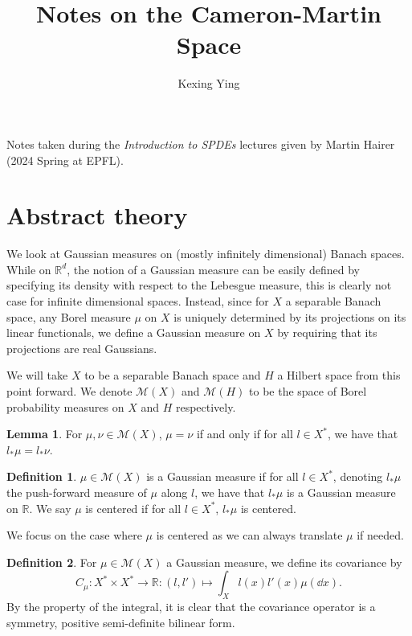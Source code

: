 \documentclass[]{article}
\title{Notes on the Cameron-Martin Space}
\author{Kexing Ying}
\theoremstyle{definition}
\theoremstyle{definition}
\newtheorem{definition}{Definition}[section]
\newtheorem{lemma}{Lemma}[section]
\begin{document}
\maketitle

Notes taken during the \textit{Introduction to SPDEs} lectures given by Martin Hairer 
(2024 Spring at EPFL).

\section*{Abstract theory}

We look at Gaussian measures on (mostly infinitely dimensional) Banach spaces. While on \(\mathbb{R}^d\), 
the notion of a Gaussian measure can be easily defined by specifying its density with respect to the 
Lebesgue measure, this is clearly not case for infinite dimensional spaces. Instead, since for \(X\) a 
separable Banach space, any Borel measure \(\mu\) on \(X\) is uniquely determined by its projections 
on its linear functionals, we define a Gaussian measure on \(X\) by requiring that its projections are 
real Gaussians. 

We will take \(X\) to be a separable Banach space and \(H\) a Hilbert space from this point forward.
We denote \(\mathcal{M}(X)\) and \(\mathcal{M}(H)\) to be the space of Borel probability measures 
on \(X\) and \(H\) respectively.

\begin{lemma}
  For \(\mu, \nu \in \mathcal{M}(X)\), \(\mu = \nu\) if and only if for all \(l \in X^*\), we have that 
  \(l_* \mu = l_* \nu\).
\end{lemma}

\begin{definition}
  \(\mu \in \mathcal{M}(X)\) is a Gaussian measure if for all \(l \in X^*\), denoting \(l_* \mu\) the 
  push-forward measure of \(\mu\) along \(l\), we have that \(l_* \mu\) is a Gaussian measure on \(\mathbb{R}\).
  We say \(\mu\) is centered if for all \(l \in X^*\), \(l_* \mu\) is centered.
\end{definition}

We focus on the case where \(\mu\) is centered as we can always translate \(\mu\) if needed.

\begin{definition}
  For \(\mu \in \mathcal{M}(X)\) a Gaussian measure, we define its covariance by 
  \[C_\mu : X^* \times X^* \to \mathbb{R} : (l, l') \mapsto \int_X l(x) l'(x) \mu(\dd x).\] 
  By the property of the integral, it is clear that the covariance operator is a symmetry, positive semi-definite 
  bilinear form.
\end{definition}
\end{document}

